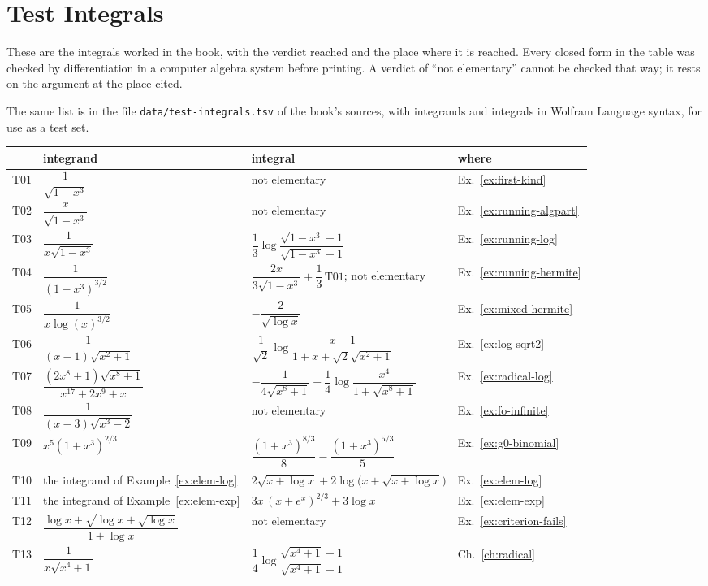 \chapter{Test Integrals}\label{app:test-integrals}

These are the integrals worked in the book, with the verdict reached and the
place where it is reached. Every closed form in the table was checked by
differentiation in a computer algebra system before printing. A verdict of
``not elementary'' cannot be checked that way; it rests on the argument at
the place cited.

The same list is in the file \texttt{data/test-integrals.tsv} of the book's
sources, with integrands and integrals in Wolfram Language syntax, for use
as a test set.

\begin{center}
\renewcommand{\arraystretch}{1.9}
\small
\begin{longtable}{@{}l>{\raggedright}p{.30\linewidth}>{\raggedright}p{.37\linewidth}l@{}}
\toprule
 & integrand & integral & where \\
\midrule
\endhead
T01 & $\dfrac{1}{\sqrt{1 - x^3}}$ & not elementary & Ex.~\ref{ex:first-kind} \\
T02 & $\dfrac{x}{\sqrt{1 - x^3}}$ & not elementary & Ex.~\ref{ex:running-algpart} \\
T03 & $\dfrac{1}{x \sqrt{1 - x^3}}$ &
  $\dfrac13 \log \dfrac{\sqrt{1 - x^3} - 1}{\sqrt{1 - x^3} + 1}$ & Ex.~\ref{ex:running-log} \\
T04 & $\dfrac{1}{(1 - x^3)^{3/2}}$ &
  $\dfrac{2x}{3\sqrt{1 - x^3}} + \dfrac13\,\mathrm{T01}$; not elementary & Ex.~\ref{ex:running-hermite} \\
T05 & $\dfrac{1}{x \log(x)^{3/2}}$ & $-\dfrac{2}{\sqrt{\log x}}$ & Ex.~\ref{ex:mixed-hermite} \\
T06 & $\dfrac{1}{(x - 1)\sqrt{x^2 + 1}}$ &
  $\dfrac{1}{\sqrt2} \log \dfrac{x - 1}{1 + x + \sqrt2 \sqrt{x^2 + 1}}$ & Ex.~\ref{ex:log-sqrt2} \\
T07 & $\dfrac{(2x^8 + 1)\sqrt{x^8 + 1}}{x^{17} + 2x^9 + x}$ &
  $-\dfrac{1}{4\sqrt{x^8 + 1}} + \dfrac14 \log \dfrac{x^4}{1 + \sqrt{x^8 + 1}}$ & Ex.~\ref{ex:radical-log} \\
T08 & $\dfrac{1}{(x - 3)\sqrt{x^3 - 2}}$ & not elementary & Ex.~\ref{ex:fo-infinite} \\
T09 & $x^5 (1 + x^3)^{2/3}$ &
  $\dfrac{(1 + x^3)^{8/3}}{8} - \dfrac{(1 + x^3)^{5/3}}{5}$ & Ex.~\ref{ex:g0-binomial} \\
T10 & the integrand of Example~\ref{ex:elem-log} &
  $2\sqrt{x + \log x} + 2 \log\bigl(x + \sqrt{x + \log x}\bigr)$ & Ex.~\ref{ex:elem-log} \\
T11 & the integrand of Example~\ref{ex:elem-exp} &
  $3x\,(x + e^x)^{2/3} + 3 \log x$ & Ex.~\ref{ex:elem-exp} \\
T12 & $\dfrac{\log x + \sqrt{\log x + \sqrt{\log x}}}{1 + \log x}$ & not elementary & Ex.~\ref{ex:criterion-fails} \\
T13 & $\dfrac{1}{x\sqrt{x^4 + 1}}$ &
  $\dfrac14 \log \dfrac{\sqrt{x^4 + 1} - 1}{\sqrt{x^4 + 1} + 1}$ & Ch.~\ref{ch:radical} \\
\bottomrule
\end{longtable}
\end{center}

